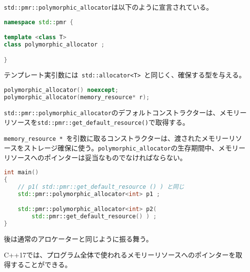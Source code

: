 \lstinline!std::pmr::polymorphic_allocator!は以下のように宣言されている。

\begin{lstlisting}[language=C++]
namespace std::pmr {

template <class T>
class polymorphic_allocator ;

}
\end{lstlisting}

テンプレート実引数には~\lstinline!std::allocator<T>!~と同じく、確保する型を与える。

%

\bgroup
\begin{lstlisting}[language=C++]
polymorphic_allocator() noexcept;
polymorphic_allocator(memory_resource* r);
\end{lstlisting}
\egroup

\lstinline!std::pmr::polymorphic_allocator!のデフォルトコンストラクターは、メモリーリソースを\lstinline!std::pmr::get_default_resource()!で取得する。

\lstinline!memory_resource *!~を引数に取るコンストラクターは、渡されたメモリーリソースをストレージ確保に使う。\lstinline!polymorphic_allocator!の生存期間中、メモリーリソースへのポインターは妥当なものでなければならない。

\begin{lstlisting}[language=C++]
int main()
{
    // p1( std::pmr::get_default_resource () ) と同じ
    std::pmr::polymorphic_allocator<int> p1 ;

    std::pmr::polymorphic_allocator<int> p2(
        std::pmr::get_default_resource() ) ;
}
\end{lstlisting}

後は通常のアロケーターと同じように振る舞う。

%

C++17では、プログラム全体で使われるメモリーリソースへのポインターを取得することができる。

%

